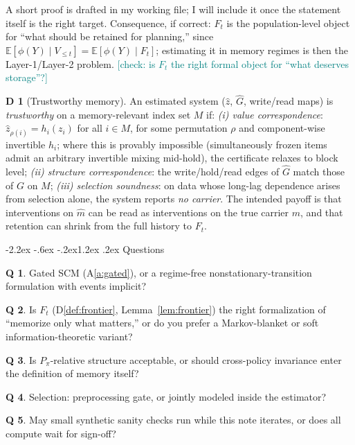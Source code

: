 \documentclass[10pt]{article}
\makeatletter
\newcommand{\past}{V_{\le t}}
\newcommand{\checkY}[1]{\textcolor{teal}{\footnotesize [check: #1]}}
\renewcommand\section{\@startsection{section}{1}{\z@}%
  {-2.2ex \@plus -.6ex \@minus -.2ex}{1.2ex \@plus .2ex}%
  {\normalfont\large\bfseries}}
\theoremstyle{plain}
\theoremstyle{definition}
\newtheorem{definitionx}{D}
\newtheorem{questionx}{Q}
\makeatother
\begin{document}
\noindent A short proof is drafted in my working file; I will include it once the statement itself is the right target. Consequence, if correct: $F_t$ is the population-level object for ``what should be retained for planning,'' since $\mathbb{E}[\phi(Y) \mid \past] = \mathbb{E}[\phi(Y) \mid F_t]$; estimating it in memory regimes is then the Layer-1/Layer-2 problem. \checkY{is $F_t$ the right formal object for ``what deserves storage''?}

\begin{definitionx}[Trustworthy memory]\label{def:trust}
An estimated system ($\hat z$, $\hat G$, write/read maps) is \emph{trustworthy} on a memory-relevant index set $M$ if:
\emph{(i) value correspondence}: $\hat z_{\rho(i)} = h_i(z_i)$ for all $i \in M$, for some permutation $\rho$ and component-wise invertible $h_i$; where this is provably impossible (simultaneously frozen items admit an arbitrary invertible mixing mid-hold), the certificate relaxes to block level;
\emph{(ii) structure correspondence}: the write/hold/read edges of $\hat G$ match those of $G$ on $M$;
\emph{(iii) selection soundness}: on data whose long-lag dependence arises from selection alone, the system reports \emph{no carrier}.
The intended payoff is that interventions on $\hat m$ can be read as interventions on the true carrier $m$, and that retention can shrink from the full history to $F_t$.
\end{definitionx}

\section{Questions}\label{sec:questions}

\begin{questionx}
Gated SCM (A\ref{a:gated}), or a regime-free nonstationary-transition formulation with events implicit?
\end{questionx}
\begin{questionx}
Is $F_t$ (D\ref{def:frontier}, Lemma~\ref{lem:frontier}) the right formalization of ``memorize only what matters,'' or do you prefer a Markov-blanket or soft information-theoretic variant?
\end{questionx}
\begin{questionx}
Is $P_\pi$-relative structure acceptable, or should cross-policy invariance enter the definition of memory itself?
\end{questionx}
\begin{questionx}
Selection: preprocessing gate, or jointly modeled inside the estimator?
\end{questionx}
\begin{questionx}
May small synthetic sanity checks run while this note iterates, or does all compute wait for sign-off?
\end{questionx}
\end{document}
